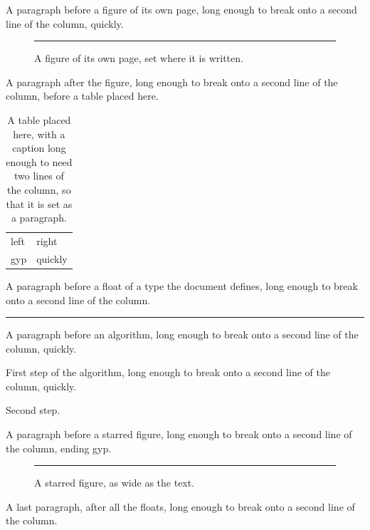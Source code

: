 \documentclass{article}
\begin{document}
A paragraph before a figure of its own page, long enough to break onto a second
line of the column, quickly.
\begin{figure}[H]
  \centering
  \rule{3cm}{1cm}
  \caption{A figure of its own page, set where it is written.}
\end{figure}
A paragraph after the figure, long enough to break onto a second line of the
column, before a table placed here.
\begin{table}[H]
  \centering
  \begin{tabular}{ll}
    left & right \\
    gyp & quickly
  \end{tabular}
  \caption{A table placed here, with a caption long enough to need two lines
    of the column, so that it is set as a paragraph.}
\end{table}
A paragraph before a float of a type the document defines, long enough to
break onto a second line of the column.
\begin{program}[H]
  \centering
  \rule{4cm}{0.5cm}
  \caption{A program, a float of the document's own type.}
\end{program}
A paragraph before an algorithm, long enough to break onto a second line of the
column, quickly.
\begin{algorithm}[H]
  \caption{An algorithm, ruled above and below its caption}
  First step of the algorithm, long enough to break onto a second line of the
  column, quickly.

  Second step.
\end{algorithm}
A paragraph before a starred figure, long enough to break onto a second line of
the column, ending gyp.
\begin{figure}[H]
  \centering
  \rule{5cm}{1cm}
  \caption{A starred figure, as wide as the text.}
\end{figure}
A last paragraph, after all the floats, long enough to break onto a second line
of the column.
\end{document}
